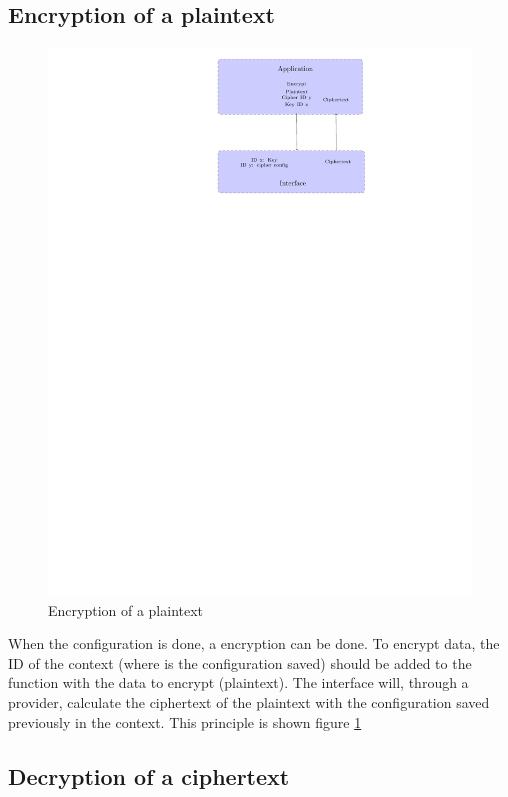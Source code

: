 \subsection*{Encryption of a plaintext}
\begin{figure}[!ht]
\centering
\includegraphics[trim=13cm 20.5cm 10cm 0cm]{figures/cipher_encrypt.pdf}
\caption{Encryption of a plaintext}
\label{fig:gci_cipher_encrypt}
\end{figure}
When the configuration is done, a encryption can be done.
To encrypt data, the ID of the context (where is the configuration saved)
should be added to the function with the data to encrypt (plaintext).
The interface will, through a provider, calculate the ciphertext of the
plaintext with the configuration saved previously in the context.
This principle is shown figure \ref{fig:gci_cipher_encrypt}


\subsection*{Decryption of a ciphertext}

